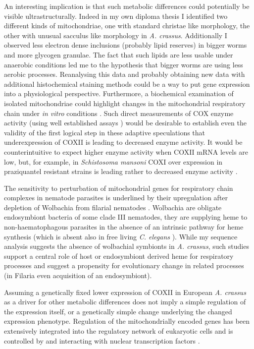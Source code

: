 \documentclass[10pt]{article}
\begin{document}
An interesting implication is that such metabolic differences could
potentially be visible ultrastructurally. Indeed in my own diploma
thesis \cite{heitlinger_vergleichende_2008} I identified two different
kinds of mitochondriae, one with standard christae like morphology,
the other with unusual sacculus like morphology in
\textit{A. crassus}. Additionally I observed less electron dense
inclusions (probably lipid reserves) in bigger worms and more glycogen
granulae. The fact that such lipids are less usable under anaerobic
conditions led me to the hypothesis that bigger worms are using less
aerobic processes. Reanalysing this data and probably obtaining new
data with additional histochemical staining methods could be a way to
put gene expression into a physiological perspective. Furthermore, a
biochemical examination of isolated mitochondriae could highlight
changes in the mitochondrial respiratory chain under \textit{in vitro}
conditions \cite{pmid18314717}. Such direct measurements of COX enzyme
activity (using well established assays \cite{pmid8592440}) would be
desirable to establish even the validity of the first logical step in
these adaptive speculations that underexpression of COXII is leading
to decreased enzyme activity. It would be counterintuitive to expect
higher enzyme activity when COXII mRNA levels are low, but, for
example, in \textit{Schistosoma mansoni} COXI over expression in
praziquantel resistant strains is leading rather to decreased enzyme
activity \cite{pmid9695101}.

The sensitivity to perturbation of mitochondrial genes for respiratory
chain complexes in nematode parasites is underlined by their
upregulation after depletion of Wolbachia from filarial nematodes
\cite{pmid20362581, pmid19806204}. Wolbachia are obligate endosymbiont
bacteria of some clade III nematodes, they are supplying heme to
non-haematophagous parasites in the absence of an intrinsic pathway
for heme synthesis \cite{ghedin_draft_2007} (which is absent also in
free living \textit{C. elegans} \cite{pmid15767563}). While my
sequence analysis suggests the absence of wolbachial symbionts in
\textit{A. crassus}, such studies support a central role of host or
endosymbiont derived heme for respiratory processes and suggest a
propensity for evolutionary change in related processes (in Filaria
even acquisition of an endosymbiont).

Assuming a genetically fixed lower expression of COXII in European
\textit{A. crassus} as a driver for other metabolic differences does
not imply a simple regulation of the expression itself, or a
genetically simple change underlying the changed expression
phenotype. Regulation of the mitochondrially encoded genes has been
extensively integrated into the regulatory network of eukaryotic
cells and is controlled by and interacting with nuclear transcription
factors \cite{pmid8289797}.
\end{document}
